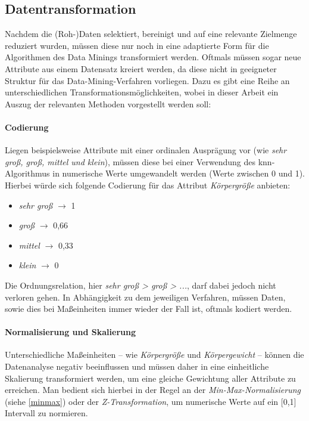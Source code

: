 \subsection{Datentransformation}
Nachdem die (Roh-)Daten selektiert, bereinigt und auf eine relevante Zielmenge reduziert wurden, müssen diese nur noch in eine adaptierte Form für die Algorithmen des Data Minings transformiert werden. Oftmals müssen sogar neue Attribute aus einem Datensatz kreiert werden, da diese nicht in geeigneter Struktur für das Data-Mining-Verfahren vorliegen. Dazu es gibt eine Reihe an unterschiedlichen Transformationsmöglichkeiten, wobei in dieser Arbeit ein Auszug der relevanten Methoden vorgestellt werden soll:

\paragraph{Codierung}
Liegen beispielsweise Attribute mit einer ordinalen Ausprägung vor (wie \textit{sehr groß, groß, mittel und klein}), müssen diese bei einer Verwendung des \gls{knn}-Algorithmus in numerische Werte umgewandelt werden (Werte zwischen 0 und 1). Hierbei würde sich folgende Codierung für das Attribut \textit{Körpergröße} anbieten:

\begin{itemize}
\item \textit{sehr groß} $\rightarrow$ 1
\item \textit{groß} $\rightarrow$ 0,66
\item \textit{mittel} $\rightarrow$ 0,33
\item \textit{klein} $\rightarrow$ 0
\end{itemize}

Die Ordnungsrelation, hier \textit{sehr groß > groß > ...}, darf dabei jedoch nicht verloren gehen. In Abhängigkeit zu dem jeweiligen Verfahren, müssen Daten, sowie dies bei Maßeinheiten immer wieder der Fall ist, oftmals kodiert werden.

\paragraph{Normalisierung und Skalierung}
Unterschiedliche Maßeinheiten -- wie \textit{Körpergröße} und \textit{Körpergewicht} -- können die Datenanalyse negativ beeinflussen und müssen daher in eine einheitliche Skalierung transformiert werden, um eine gleiche Gewichtung aller Attribute zu erreichen. Man bedient sich hierbei in der Regel an der \textit{Min-Max-Normalisierung} (siehe \vref{minmax}) oder der \textit{Z-Transformation}, um numerische Werte auf ein [0,1] Intervall zu normieren.

